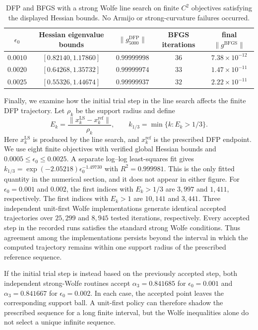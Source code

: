 \documentclass[11pt]{article}
\begin{document}
\begin{table}[!htbp]
\caption{DFP and BFGS with a strong Wolfe line search on finite $C^2$
objectives satisfying the displayed Hessian bounds.  No Armijo or
strong-curvature failures occurred.}
\label{tab:finite-comparison}
\centering
\small
\setlength{\tabcolsep}{3.7pt}
\begin{tabular}{@{}ccccc@{}}
\toprule
$\epsilon_0$ & Hessian eigenvalue bounds &
$\|g_{5000}^{\mathrm{DFP}}\|$ & BFGS iterations &
final $\|g^{\mathrm{BFGS}}\|$\\
\midrule
$0.0010$ & $[0.82140,1.17860]$ & $0.99999998$ & $36$ & $7.38\times10^{-12}$\\
$0.0020$ & $[0.64268,1.35732]$ & $0.99999974$ & $33$ & $1.47\times10^{-11}$\\
$0.0025$ & $[0.55326,1.44674]$ & $0.99999937$ & $32$ & $2.22\times10^{-11}$\\
\bottomrule
\end{tabular}
\end{table}
\FloatBarrier

Finally, we examine how the initial trial step in the line search affects the
finite DFP trajectory.  Let $\rho_k$ be the support radius and define
\[
E_k=\frac{\|x_k^{\mathrm{LS}}-x_k^{\mathrm{ref}}\|}{\rho_k},
\qquad
k_{1/3}=\min\{k:E_k>1/3\}.
\]
Here $x_k^{\mathrm{LS}}$ is produced by the line search, and
$x_k^{\mathrm{ref}}$ is the prescribed DFP endpoint.  We use eight finite
objectives with verified global Hessian bounds and
$0.0005\le\epsilon_0\le0.0025$.  A separate log--log least-squares fit gives
$k_{1/3}=\exp(-2.05218)\epsilon_0^{-1.49730}$ with $R^2=0.999981$.  This is the
only fitted quantity in the numerical section, and it does not appear in
either figure.  For $\epsilon_0=0.001$ and $0.002$, the first indices with
$E_k>1/3$ are $3{,}997$ and $1{,}411$, respectively.  The first indices with
$E_k>1$ are $10{,}141$ and $3{,}441$.  Three independent unit-first Wolfe
implementations generate identical accepted trajectories over $25{,}299$ and
$8{,}945$ tested iterations, respectively.  Every accepted step in the
recorded runs satisfies the standard strong Wolfe conditions.  Thus agreement
among the implementations persists beyond the interval in which the computed
trajectory remains within one support radius of the prescribed reference
sequence.

If the initial trial step is instead based on the previously accepted step,
both independent strong-Wolfe routines accept $\alpha_3=0.841685$ for
$\epsilon_0=0.001$ and $\alpha_3=0.841667$ for $\epsilon_0=0.002$.  In each
case, the accepted point leaves the corresponding support ball.  A unit-first
policy can therefore shadow the prescribed sequence for a long finite
interval, but the Wolfe inequalities alone do not select a unique infinite
sequence.
\end{document}
